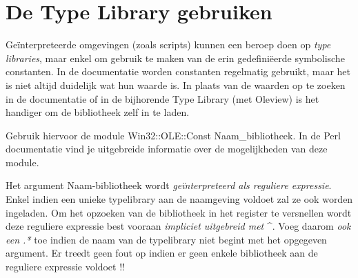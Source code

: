 \documentclass[11pt,a4paper]{report}
\begin{document}
\section{De Type Library gebruiken}
Geïnterpreteerde omgevingen (zoals scripts) kunnen een beroep doen op \textit{type libraries}, maar enkel om gebruik te maken van de erin gedefiniëerde symbolische constanten. In de documentatie worden constanten regelmatig gebruikt, maar het is niet altijd duidelijk wat hun waarde is. In plaats van de waarden op te zoeken in de documentatie of in de bijhorende Type Library (met Oleview) is het handiger om de bibliotheek zelf in te laden.
\par Gebruik hiervoor de module Win32::OLE::Const Naam\_bibliotheek. In de Perl documentatie vind je uitgebreide informatie over de mogelijkheden van deze module.
\par Het argument Naam-bibliotheek wordt \textit{geïnterpreteerd als reguliere expressie}. Enkel indien een unieke typelibrary aan de naamgeving voldoet zal ze ook worden ingeladen. Om het opzoeken van de bibliotheek in het register te versnellen wordt deze reguliere expressie best vooraan \textit{impliciet uitgebreid met }\^{}. Voeg daarom \textit{ook een .*} toe indien de naam van de typelibrary niet begint met het opgegeven argument. Er treedt geen fout op indien er geen enkele bibliotheek aan de reguliere expressie voldoet !!
\end{document}

